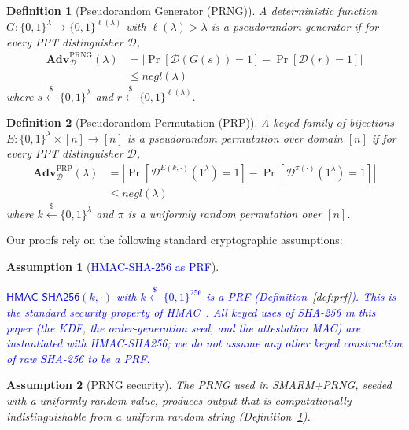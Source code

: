 \documentclass[journal]{IEEEtran}
\newcommand\ben[1]{\textcolor{blue}{#1}}
\newcommand{\rtsmarmone}{SMARM+PRNG\xspace}
\newtheorem{definition}{Definition}
\newtheorem{assumption}{Assumption}[section]
\newcommand{\Adv}{\mathbf{Adv}}
\begin{document}
\begin{definition}[Pseudorandom Generator (PRNG)]
\label{def:prng}
A deterministic function $G : \{0,1\}^{\lambda} \to \{0,1\}^{\ell(\lambda)}$
with $\ell(\lambda) > \lambda$ is a \emph{pseudorandom generator} if for
every PPT distinguisher $\mathcal{D}$,
\[
\begin{aligned}
  \Adv^{\mathrm{PRNG}}_{\mathcal{D}}(\lambda)
  &=
  \left|
    \Pr\!\left[\mathcal{D}(G(s)) = 1\right]
    -
    \Pr\!\left[\mathcal{D}(r) = 1\right]
  \right| \\
  &\leq \mathit{negl}(\lambda)
\end{aligned}
\]
where $s \xleftarrow{\$} \{0,1\}^{\lambda}$ and
$r \xleftarrow{\$} \{0,1\}^{\ell(\lambda)}$.
\end{definition}
 
\begin{definition}[Pseudorandom Permutation (PRP)]
\label{def:prp}
A keyed family of bijections
$E : \{0,1\}^{\lambda} \times [n] \to [n]$
is a \emph{pseudorandom permutation} over domain $[n]$ if for every
PPT distinguisher $\mathcal{D}$,
\[
\begin{aligned}
  \Adv^{\mathrm{PRP}}_{\mathcal{D}}(\lambda)
  &=
  \left|
    \Pr\!\left[\mathcal{D}^{E(k,\cdot)}(1^{\lambda}) = 1\right]
    -
    \Pr\!\left[\mathcal{D}^{\pi(\cdot)}(1^{\lambda}) = 1\right]
  \right|\\
  &\leq \mathit{negl}(\lambda)
\end{aligned}
\]
where $k \xleftarrow{\$} \{0,1\}^{\lambda}$ and $\pi$ is a uniformly random
permutation over $[n]$.
\end{definition}
 
Our proofs rely on the following standard cryptographic assumptions:
 
\begin{assumption}[\ben{HMAC-SHA-256 as PRF}]
\label{asm:sha256-prf}

\ben{$\mathsf{HMAC\text{-}SHA256}(k,\cdot)$ with $k \xleftarrow{\$} \{0,1\}^{256}$ is a PRF (Definition~\ref{def:prf}).
This is the standard security property of HMAC~\cite{bellare1996new,bellare2006hmac}.
All keyed uses of SHA-256 in this paper (the KDF, the order-generation seed, and the attestation MAC) are instantiated with HMAC-SHA256; we do not assume any other keyed construction of raw SHA-256 to be a PRF.}
\end{assumption}
 
\begin{assumption}[PRNG security]
\label{asm:prng}
The PRNG used in \rtsmarmone, seeded with a uniformly random value, produces
output that is computationally indistinguishable from a uniform random string
(Definition~\ref{def:prng}).
\end{assumption}
 
\end{document}
